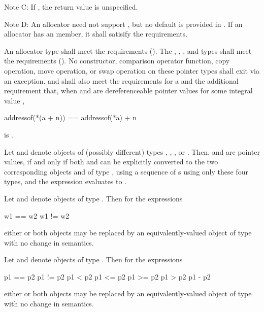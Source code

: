 \pnum
Note C:
If , the return value is unspecified.

\pnum
Note D:
An allocator need not support ,
but no default is provided in .
If an allocator has an  member,
it shall satisify the requirements.

\pnum
An allocator type  shall meet the
 requirements ().
The , , , and
 types shall meet the
 requirements ().
No constructor,
comparison operator function, copy operation, move operation, or swap operation on
these pointer types shall exit via an exception.  and  shall also
meet the requirements for
a  and
the additional requirement that, when  and  are
dereferenceable pointer values for some integral value ,
\begin{codeblock}
addressof(*(a + n)) == addressof(*a) + n
\end{codeblock}
is .

\pnum
Let  and  denote objects of (possibly different) types
, , ,
or . Then,  and  are
 pointer values, if and only if both  and 
can be explicitly converted to the two corresponding objects  and 
of type , using a sequence of s
using only these four types, and the expression 
evaluates to .

\pnum
Let  and  denote objects of type .
Then for the expressions
\begin{codeblock}
w1 == w2
w1 != w2
\end{codeblock}
either or both objects may be replaced by an equivalently-valued object of type
 with no change in semantics.

\pnum
Let  and  denote objects of type .
Then for the expressions
\begin{codeblock}
p1 == p2
p1 != p2
p1 < p2
p1 <= p2
p1 >= p2
p1 > p2
p1 - p2
\end{codeblock}
either or both objects may be replaced by an equivalently-valued object of type
 with no change in semantics.

